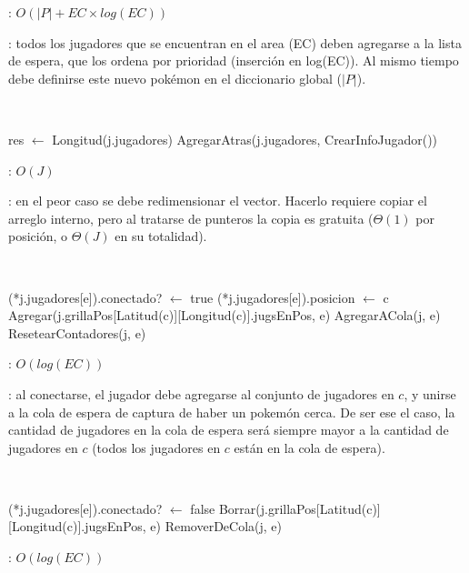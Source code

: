 \begin{Algoritmos}
	\complejidad: $O(|P| + EC \times log(EC))$

	\justifcomp: todos los jugadores que se encuentran en el area (EC) deben agregarse a la lista de espera, que los ordena por prioridad (inserción en log(EC)). Al mismo tiempo debe definirse este nuevo pokémon en el diccionario global ($|P|$).

	~

	\begin{algorithm}[H]
		\NoCaptionOfAlgo
		\caption{}
		res $\leftarrow$ Longitud(j.jugadores)
		AgregarAtras(j.jugadores, CrearInfoJugador())
	\end{algorithm}

	\complejidad: $O(J)$

	\justifcomp: en el peor caso se debe redimensionar el vector. Hacerlo requiere copiar el arreglo interno, pero al tratarse de punteros la copia es gratuita ($\Theta(1)$ por posición, o $\Theta(J)$ en su totalidad).

	~

	\begin{algorithm}[H]
		\NoCaptionOfAlgo
		\caption{}
		(*j.jugadores[e]).conectado? $\leftarrow$ true
		(*j.jugadores[e]).posicion $\leftarrow$ c
		Agregar(j.grillaPos[Latitud(c)][Longitud(c)].jugsEnPos, e)
		AgregarACola(j, e)
		ResetearContadores(j, e)
	\end{algorithm}

	\complejidad: $O(log(EC))$

	\justifcomp: al conectarse, el jugador debe agregarse al conjunto de jugadores en $c$, y unirse a la cola de espera de captura de haber un pokemón cerca. De ser ese el caso, la cantidad de jugadores en la cola de espera será siempre mayor a la cantidad de jugadores en $c$ (todos los jugadores en $c$ están en la cola de espera).

	~

	\begin{algorithm}[H]
		\NoCaptionOfAlgo
		\caption{}
		(*j.jugadores[e]).conectado? $\leftarrow$ false
		Borrar(j.grillaPos[Latitud(c)][Longitud(c)].jugsEnPos, e)
		RemoverDeCola(j, e)
	\end{algorithm}

	\complejidad: $O(log(EC))$


\end{Algoritmos}
